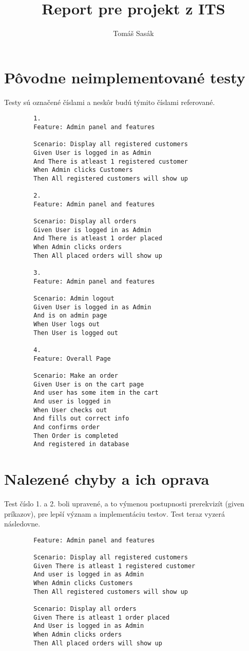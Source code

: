 \documentclass[titlepage]{article}
\begin{document}
    
    \title{Report pre projekt z ITS}
    \author{Tomáš Sasák}
    \maketitle

    \section{Pôvodne neimplementované testy}
    Testy sú označené číslami a neskôr budú týmito číslami referované.
    \begin{verbatim}
        1.
        Feature: Admin panel and features

        Scenario: Display all registered customers
        Given User is logged in as Admin
        And There is atleast 1 registered customer
        When Admin clicks Customers
        Then All registered customers will show up

        2.
        Feature: Admin panel and features

        Scenario: Display all orders
        Given User is logged in as Admin
        And There is atleast 1 order placed
        When Admin clicks orders
        Then All placed orders will show up

        3.
        Feature: Admin panel and features

        Scenario: Admin logout
        Given User is logged in as Admin
        And is on admin page
        When User logs out
        Then User is logged out

        4.
        Feature: Overall Page

        Scenario: Make an order
        Given User is on the cart page 
        And user has some item in the cart
        And user is logged in
        When User checks out 
        And fills out correct info
        And confirms order
        Then Order is completed 
        And registered in database
    \end{verbatim}

    \section{Nalezené chyby a ich oprava}
    \par 
        Test číslo 1. a 2. boli upravené, a to výmenou postupnosti
        prerekvizít (given príkazov), pre lepší význam a implementáciu testov.
        Test teraz vyzerá následovne.
        \begin{verbatim}
        Feature: Admin panel and features

        Scenario: Display all registered customers
        Given There is atleast 1 registered customer
        And user is logged in as Admin
        When Admin clicks Customers
        Then All registered customers will show up

        Scenario: Display all orders
        Given There is atleast 1 order placed
        And User is logged in as Admin
        When Admin clicks orders
        Then All placed orders will show up
        \end{verbatim}
\end{document}
